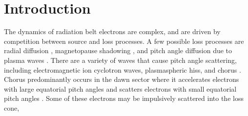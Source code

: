 \documentclass[draft, linenumbers]{agujournal}
\begin{document}
\section{Introduction}\label{Intro}
The dynamics of radiation belt electrons are complex, and are driven by competition between source and loss processes. A few possible loss processes are radial diffusion \citep{Shprits2004}, magnetopause shadowing \citep{Ukhorskiy2006}, and pitch angle  diffusion due to  plasma waves \citep[e.g.][]{Abel1998_1, Summers1998, Meredith2002, Selesnick2003, Horne2003, Thorne2005}.   There are a variety of waves that cause pitch angle scattering, including electromagnetic ion cyclotron waves, plasmaspheric hiss, and  chorus \citep{Millan2007, Thorne2010}.  Chorus predominantly occurs in the dawn sector \citep{Li2009} where it accelerates electrons with large equatorial pitch angles and scatters electrons with small equatorial pitch angles \citep{Horne2003}. Some of these electrons may be impulsively scattered into the loss cone, 
\end{document}
